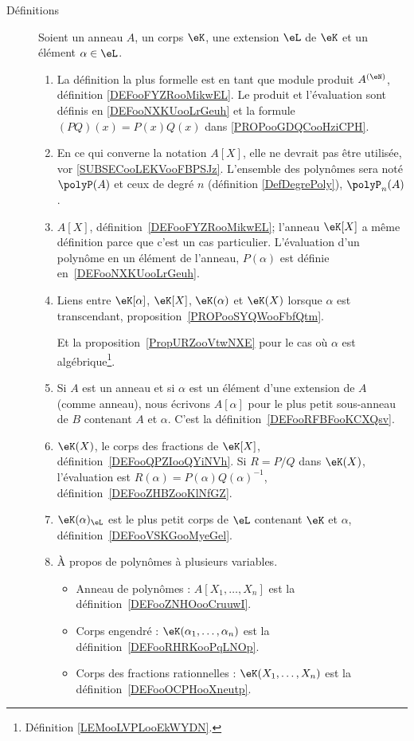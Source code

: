 \begin{description}
    \item[Définitions]
        Soient un anneau \( A\), un corps \( \eK\), une extension \( \eL\) de \( \eK\) et un élément \( \alpha\in \eL\).
        \begin{enumerate}
            \item
                La définition la plus formelle est en tant que module produit \( A^{(\eN)}\), définition \ref{DEFooFYZRooMikwEL}. Le produit et l'évaluation sont définis en \ref{DEFooNXKUooLrGeuh} et la formule \( (PQ)(x)=P(x)Q(x)\) dans \ref{PROPooGDQCooHziCPH}.
            \item
                En ce qui converne la notation \( A[X]\), elle ne devrait pas être utilisée, vor \ref{SUBSECooLEKVooFBPSJz}. L'ensemble des polynômes sera noté \( \polyP(A)\) et ceux de degré \( n\) (définition \ref{DefDegrePoly}), \( \polyP_n(A)\).
            \item
                \( A[X]\), définition~\ref{DEFooFYZRooMikwEL}; l'anneau \( \eK[X]\) a même définition parce que c'est un cas particulier. L'évaluation d'un polynôme en un élément de l'anneau, \( P(\alpha)\) est définie en~\ref{DEFooNXKUooLrGeuh}.
            \item
                Liens entre \( \eK[\alpha]\), \( \eK[X]\), \( \eK(\alpha)\) et \( \eK(X)\) lorsque \( \alpha\) est transcendant, proposition~\ref{PROPooSYQWooFbfQtm}.

                Et la proposition~\ref{PropURZooVtwNXE} pour le cas où \( \alpha\) est algébrique\footnote{Définition \ref{LEMooLVPLooEkWYDN}.}.
            \item
                Si \( A\) est un anneau et si \( \alpha\) est un élément d'une extension de \( A\) (comme anneau), nous écrivons \( A[\alpha]\) pour le plus petit sous-anneau de \( B\) contenant \( A\) et \( \alpha\). C'est la définition~\ref{DEFooRFBFooKCXQsv}.
            \item
                \( \eK(X)\), le corps des fractions de \( \eK[X]\), définition~\ref{DEFooQPZIooQYiNVh}. Si \( R=P/Q\) dans \( \eK(X)\), l'évaluation est \( R(\alpha)=P(\alpha)Q(\alpha)^{-1}\), définition~\ref{DEFooZHBZooKlNfGZ}.
            \item
                \( \eK(\alpha)_{\eL}\) est le plus petit corps de \( \eL\) contenant \( \eK\) et \( \alpha\), définition~\ref{DEFooVSKGooMyeGel}.
            \item
                À propos de polynômes à plusieurs variables.
                \begin{itemize}
                    \item Anneau de polynômes : \( A[X_1,\ldots, X_n]\) est la définition~\ref{DEFooZNHOooCruuwI}. 
                    \item Corps engendré : \( \eK(\alpha_1,\ldots, \alpha_n)\) est la définition~\ref{DEFooRHRKooPqLNOp}. 
                    \item Corps des fractions rationnelles : \( \eK(X_1,\ldots, X_n)\) est la définition~\ref{DEFooOCPHooXneutp}.
                \end{itemize}
        \end{enumerate}


\end{description}

